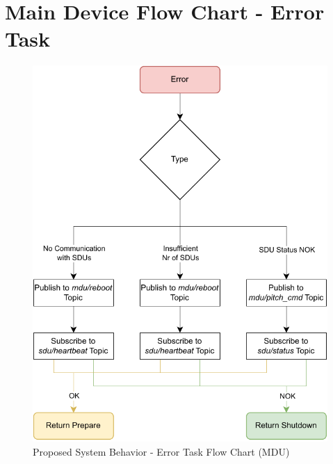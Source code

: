 
\chapter{Main Device Flow Chart - Error Task} %

\label{AppendixC}

\begin{figure}[H]
    \centering
    \includegraphics[scale=0.75]{appendices/assets/MDU_ERROR.pdf}
    \caption{Proposed System Behavior - Error Task Flow Chart (MDU)}
    \label{fig:MDU_ERROR}
\end{figure}

